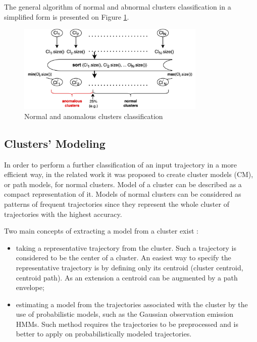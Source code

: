The general algorithm of normal and abnormal clusters classification in a simplified form is presented on Figure \ref{fig:cl-classif}.

\begin{figure}[!htb]
	\centering{}
	\includegraphics[width=0.8\textwidth]{images/cl-classif.png}
	\caption{Normal and anomalous clusters classification}
	\label{fig:cl-classif}
\end{figure}

\subsection{Clusters' Modeling}

In order to perform a further classification of an input trajectory in a more efficient way, in the related work it was proposed to create cluster models (CM), or path models, for normal clusters. Model of a cluster can be described as a compact representation of it. Models of normal clusters can be considered as patterns of frequent trajectories since they represent the whole cluster of trajectories with the highest accuracy. 

Two main concepts of extracting a model from a cluster exist \cite{article:surv_cl_models}: 
\begin{itemize}
	\item taking a representative trajectory from the cluster. Such a trajectory is considered to be the center of a cluster. An easiest way to specify the representative trajectory is by defining only its centroid (cluster centroid, centroid path). As an extension a centroid can be augmented by a path envelope;
	\item estimating a model from the trajectories associated with the cluster by the use of probabilistic models, such as the Gaussian observation emission HMMs. Such method requires the trajectories to be preprocessed and is better to apply on probabilistically modeled trajectories.
\end{itemize}

